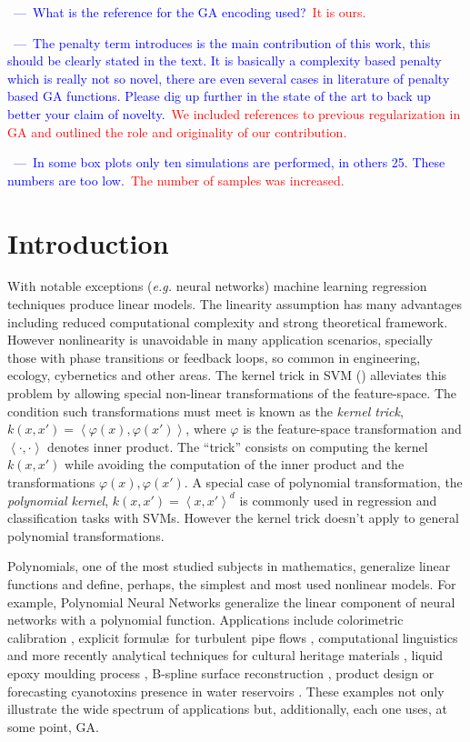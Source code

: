 \documentclass[review,preprint]{elsarticle}
\newcommand{\at}[1]{\ensuremath{\!\left(#1\right)}}
\newcommand{\review}[1]{\textcolor{blue}{~---~#1}}
\newcommand{\revised}[2]{\review{#1}~\textcolor{red}{#2}}
\begin{document}
\revised{What is the reference for the GA encoding used?}{It is ours.}

\revised{The penalty term introduces is the main contribution of this work, this should be clearly stated in the text. It is basically a complexity based penalty which is really not so novel, there are even several cases in literature of penalty based GA functions.  Please dig up further in the state of the art to back up better your claim of novelty.}{We included references to previous regularization in GA and outlined the role and originality of our contribution.}

\revised{In some box plots only ten simulations are performed, in others 25.  These numbers are too low.}{The number of samples was increased.}
%
%
\linenumbers

\section{Introduction}
With notable exceptions (\emph{e.g.} neural networks) machine learning regression techniques produce linear models. The linearity assumption has many advantages including reduced computational complexity and strong the\-o\-re\-ti\-cal framework. However nonlinearity is unavoidable in many application scenarios, specially those with phase transitions or feedback loops, so common in engineering, ecology, cybernetics and other areas. The kernel trick in \ac{SVM} (\cite{scholkopf1997kernel, liang2012eigen, Bao:2013aa}) alleviates this problem by allowing special non-linear transformations of the feature-space. The condition such transformations must meet is known as the \emph{kernel trick}, $k\at{x,x'} = \left< \varphi\at{x}, \varphi\at{x'} \right>$, where $\varphi$ is the feature-space transformation and $\left<\cdot,\cdot\right>$ denotes inner product. The ``trick'' consists on computing the kernel $k\at{x,x'}$ while avoiding the computation of the inner product and the transformations $\varphi\at{x}, \varphi\at{x'}$. A special case of polynomial transformation, the \emph{polynomial kernel}, $k\at{x,x'} = \left<x,x'\right>^d$ is commonly used in regression and classification tasks with \acp{SVM}. However the kernel trick doesn't apply to general polynomial transformations.

Polynomials, one of the most studied subjects in mathematics, generalize li\-ne\-ar functions and define, perhaps, the simplest and most used nonlinear models. For example, Polynomial Neural Networks \cite{dehuri2011condensed} generalize the linear component of neural networks with a polynomial function. Applications include colorimetric calibration \citep{Mendes:2005aa}, explicit formul\ae\ for turbulent pipe flows
 \citep{Davidson:1999aa}, computational linguistics \citep{Sanchez:2009aa} and more recently analytical techniques for cultural heritage materials \citep{Csefalvayova:2010aa}, liquid epoxy moulding process \citep{Chan:2011aa}, B-spline surface reconstruction \citep{Galvez:2012aa}, product design \citep{Chan:2012aa} or forecasting cyanotoxins presence in water reservoirs \citep{Garcia-Nieto:2013aa}. These examples not only illustrate the wide spectrum of applications but, additionally, each one uses, at some point, \ac{GA}.
\end{document}

